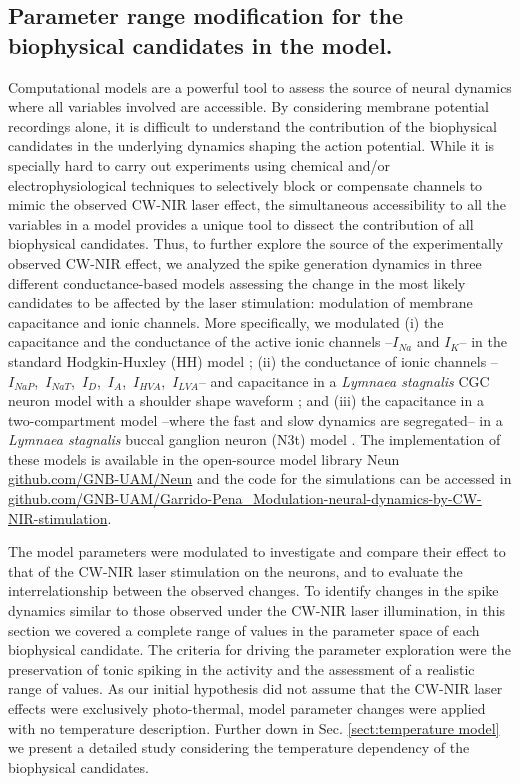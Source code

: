 
\subsection{Parameter range modification for the biophysical candidates in the model. }
Computational models are a powerful tool to assess the source of neural dynamics where all variables involved are accessible. By considering membrane potential recordings alone, it is difficult to understand the contribution of the biophysical candidates in the underlying dynamics shaping the action potential. While it is specially hard to carry out experiments using chemical and/or electrophysiological techniques to selectively block or compensate channels to mimic the observed CW-NIR laser effect, the simultaneous accessibility to all the variables in a model provides a unique tool to dissect the contribution of all biophysical candidates. Thus, to further explore the source of the experimentally observed CW-NIR effect, we analyzed the spike generation dynamics in three different conductance-based models assessing the change in the most likely candidates to be affected by the laser stimulation: modulation of membrane capacitance and ionic channels. More specifically, we modulated (i) the capacitance and the conductance of the active ionic channels --$I_{Na}$ and $I_{K}$-- in the standard Hodgkin-Huxley (HH) model \parencite{HODGKIN1952}; (ii) the conductance of ionic channels --$I_{NaP}$,~$I_{NaT}$,~$I_{D}$,~$I_{A}$,~$I_{HVA}$,~$I_{LVA}$-- and capacitance in a \textit{Lymnaea stagnalis} CGC neuron model with a shoulder shape waveform \parencite{vavoulis_balanced_2010}; and (iii) the capacitance in a two-compartment model --where the fast and slow dynamics are segregated-- in a \textit{Lymnaea stagnalis} buccal ganglion neuron (N3t) model \parencite{Vavoulis2007}. The implementation of these models is available in the open-source model library Neun \href{https://github.com/GNB-UAM/neun}{github.com/GNB-UAM/Neun} and the code for the simulations can be accessed in \href{https://github.com/GNB-UAM/Garrido-Pena_Modulation-neural-dynamics-by-CW-NIR-stimulation}{github.com/GNB-UAM/Garrido-Pena\_Modulation-neural-dynamics-by-CW-NIR-stimulation}.

The model parameters were modulated to investigate and compare their effect to that of the CW-NIR laser stimulation on the neurons, and to evaluate the interrelationship between the observed changes. To identify changes in the spike dynamics similar to those observed under the CW-NIR laser illumination, in this section we covered a complete range of values in the parameter space of each biophysical candidate. The criteria for driving the parameter exploration were the preservation of tonic spiking in the activity and the assessment of a realistic range of values.
As our initial hypothesis did not assume that the CW-NIR laser effects were exclusively photo-thermal, model parameter changes were applied with no temperature description. Further down in Sec. \ref{sect:temperature model} we present a detailed study considering the temperature dependency of the biophysical candidates. 

